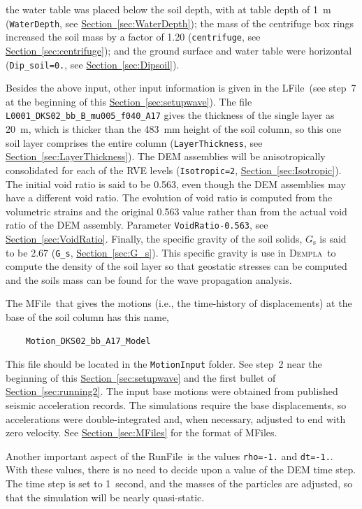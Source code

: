 \documentclass[letterpaper,11pt]{article}
\newcommand{\Dempla}{\textsc{Dempla}}
\newcommand{\RunFile}{\textsf{RunFile}}
\newcommand{\LFile}{\textsf{LFile}}
\newcommand{\MFile}{\textsf{MFile}}
\begin{document}
the water table was placed below the soil depth, with at table
depth of 1~m
(\texttt{WaterDepth},
see \hyperref[sec:WaterDepth]{Section~\ref*{sec:WaterDepth}});
the mass of the centrifuge box rings increased the soil
mass by a factor of 1.20
(\texttt{centrifuge},
see \hyperref[sec:centrifuge]{Section~\ref*{sec:centrifuge}});
and the ground surface and water table were horizontal
(\texttt{Dip\_soil=0.},
see \hyperref[sec:Dipsoil]{Section~\ref*{sec:Dipsoil}}).
%
\par
Besides the above input,
other input information is given in the \LFile\ (see
step~7 at the beginning of this
\hyperref[sec:setupwave]{Section~\ref*{sec:setupwave}}).
The file \texttt{L0001\_DKS02\_bb\_B\_mu005\_f040\_A17}
gives the thickness of the single layer as 20~m,
which is thicker than the 483~mm height of the soil column,
so this one soil layer comprises the entire column
(\texttt{LayerThickness},
see \hyperref[sec:LayerThickness]{Section~\ref*{sec:LayerThickness}}).
The DEM assemblies will be anisotropically consolidated
for each of the RVE levels
(\texttt{Isotropic=2},
\hyperref[sec:Isotropic]{Section~\ref*{sec:Isotropic}}).
The initial void ratio is said to be 0.563,
even though the DEM assemblies may have a different void ratio.
The evolution of void ratio is computed from the volumetric
strains and the original 0.563 value rather than from the actual
void ratio of the DEM assembly.
Parameter \texttt{VoidRatio-0.563},
see \hyperref[sec:VoidRatio]{Section~\ref*{sec:VoidRatio}}.
Finally, the specific gravity of the soil solids, $G_{\text{s}}$
is said to be 2.67
(\texttt{G\_s}, \hyperref[sec:G_s]{Section~\ref*{sec:G_s}}).
This specific gravity is use in \Dempla\ to compute
the density of the soil layer so that geostatic stresses
can be computed and the soils mass can be found for the
wave propagation analysis.
%
\par
The \MFile\ that gives the motions (i.e., the time-history
of displacements) at the base of the soil column has
this name,
\begin{verbatim}
	Motion_DKS02_bb_A17_Model
\end{verbatim}
This file should be located in the \texttt{MotionInput}
folder.
See step~2 near the beginning of this
\hyperref[sec:setupwave]{Section~\ref*{sec:setupwave}}
and the first bullet of
\hyperref[sec:running2]{Section~\ref*{sec:running2}}.
The input base motions were obtained from published seismic
acceleration records.
The simulations require the base displacements,
so accelerations were double-integrated and, when necessary,
adjusted to end with zero velocity.
See \hyperref[sec:MFiles]{Section~\ref*{sec:MFiles}}
for the format of \MFile s.
%
\par
Another important aspect of the \RunFile\ is
the values \texttt{rho=-1.} and \texttt{dt=-1.}.
With these values, there is no need to decide upon
a value of the DEM time step.
The time step is set to 1~second,
and the masses of the particles are adjusted,
so that the simulation will be nearly
quasi-static.
%
%
\end{document}
